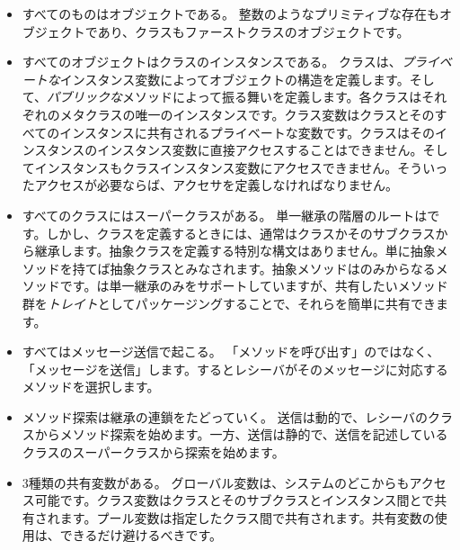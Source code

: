 \documentclass[a4paper,10pt,twoside]{book}
\begin{document}
\begin{itemize}
  \item すべてのものはオブジェクトである。
  整数のようなプリミティブな存在もオブジェクトであり、クラスもファーストクラスのオブジェクトです。

  \item すべてのオブジェクトはクラスのインスタンスである。
  クラスは、\emph{プライベートな}インスタンス変数によってオブジェクトの構造を定義します。そして、\emph{パブリックな}メソッドによって振る舞いを定義します。各クラスはそれぞれのメタクラスの唯一のインスタンスです。クラス変数はクラスとそのすべてのインスタンスに共有されるプライベートな変数です。クラスはそのインスタンスのインスタンス変数に直接アクセスすることはできません。そしてインスタンスもクラスインスタンス変数にアクセスできません。そういったアクセスが必要ならば、アクセサを定義しなければなりません。

  \item すべてのクラスにはスーパークラスがある。
  単一継承の階層のルートはです。しかし、クラスを定義するときには、通常はクラスかそのサブクラスから継承します。抽象クラスを定義する特別な構文はありません。単に抽象メソッドを持てば抽象クラスとみなされます。抽象メソッドはのみからなるメソッドです。\pharo は単一継承のみをサポートしていますが、共有したいメソッド群を\emph{トレイト}としてパッケージングすることで、それらを簡単に共有できます。

  \item すべてはメッセージ送信で起こる。
	「メソッドを呼び出す」のではなく、「メッセージを送信」します。するとレシーバがそのメッセージに対応するメソッドを選択します。

  \item メソッド探索は継承の連鎖をたどっていく。
  \self 送信は動的で、レシーバのクラスからメソッド探索を始めます。一方、\super 送信は静的で、\super 送信を記述しているクラスのスーパークラスから探索を始めます。
  
  \item 3種類の共有変数がある。
	グローバル変数は、システムのどこからもアクセス可能です。クラス変数はクラスとそのサブクラスとインスタンス間とで共有されます。プール変数は指定したクラス間で共有されます。共有変数の使用は、できるだけ避けるべきです。

\end{itemize}

\ifx\wholebook\relax\else
   
   
\end{document}
